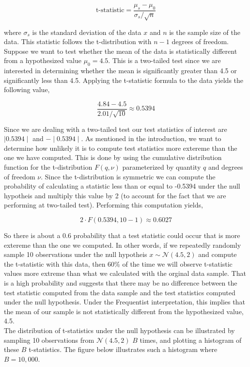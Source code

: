 \documentclass[12pt]{article}
\begin{document}
$$
\mbox{t-statistic} = \frac{\mu_s-\mu_0}{\sigma_s/\sqrt{n}}
$$

\noindent where $\sigma_s$ is the standard deviation of the data $x$ and $n$ is the sample size of the data. This statistic follows the t-distribution with $n-1$ degrees of freedom. \\

\noindent Suppose we want to test whether the mean of the data is statistically different from a hypothesized value $\mu_0 = 4.5$. This is a two-tailed test since we are interested in determining whether the mean is significantly greater than 4.5 or significantly less than 4.5. Applying the t-statistic formula to the data yields the following value,

$$
\frac{4.84-4.5}{2.01/\sqrt{10}} \approx 0.5394
$$

\noindent Since we are dealing with a two-tailed test our test statistics of interest are $\mid 0.5394 \mid$ and $-\mid 0.5394 \mid$. As mentioned in the introduction, we want to determine how unlikely it is to compute test statistics more extereme than the one we have computed. This is done by using the cumulative distribution function for the t-distribution $F(q, \nu)$ parameterized by quantity $q$ and degrees of freedom $\nu$. Since the t-distribution is symmetric we can compute the probability of calculating a statistic less than or equal to -0.5394 under the null hypotheis and multiply this value by 2 (to account for the fact that we are performing at two-tailed test). Performing this computation yields,

$$
2 \cdot F(0.5394, 10-1) \approx 0.6027
$$

\noindent So there is about a 0.6 probability that a test statistic could occur that is more extereme than the one we computed. In other words, if we repeatedly randomly sample 10 observations under the null hypotheis $x \sim \mathcal{N}(4.5, 2)$ and compute the t-statistic with this data, then 60\% of the time we will observe t-statistic values more extreme than what we calculated with the orginal data sample. That is a high probability and suggests that there may be no difference between the test statistic computed from the data sample and the test statistics computed under the null hypothesis. Under the Frequentist interpretation, this implies that the mean of our sample is not statistically different from the hypothesized value, 4.5. \\

\noindent The distribution of t-statistics under the null hypothesis can be illustrated by sampling 10 observations from $\mathcal{N}(4.5,2)$ $B$ times, and plotting a histogram of these $B$ t-statistics. The figure below illustrates such a histogram where $B = 10,000$.
\end{document}
